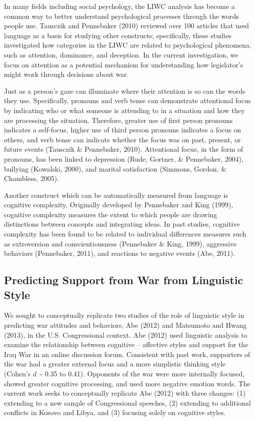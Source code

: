 \documentclass[english,,man]{apa6}
\begin{document}
In many fields including social psychology, the LIWC analysis has become a common way to better understand psychological processes through the words people use. Tausczik and Pennebaker (2010) reviewed over 100 articles that used language as a basis for studying other constructs; specifically, these studies investigated how categories in the LIWC are related to psychological phenomena, such as attention, dominance, and deception. In the current investigation, we focus on attention as a potential mechanism for understanding how legislator's might work through decisions about war.

Just as a person's gaze can illuminate where their attention is so can the words they use. Specifically, pronouns and verb tense can demonstrate attentional focus by indicating who or what someone is attending to in a situation and how they are processing the situation. Therefore, greater use of first person pronouns indicates a self-focus, higher use of third person pronouns indicates a focus on others, and verb tense can indicate whether the focus was on past, present, or future events (Tausczik \& Pennebaker, 2010). Attentional focus, in the form of pronouns, has been linked to depression (Rude, Gortner, \& Pennebaker, 2004), bullying (Kowalski, 2000), and marital satisfaction (Simmons, Gordon, \& Chambless, 2005).

Another construct which can be automatically measured from language is cognitive complexity. Originally developed by Pennebaker and King (1999), cognitive complexity measures the extent to which people are drawing distinctions between concepts and integrating ideas. In past studies, cognitive complexity has been found to be related to individual differences measures such as extroversion and conscientiousness (Pennebaker \& King, 1999), aggressive behaviors (Pennebaker, 2011), and reactions to negative events (Abe, 2011).

\hypertarget{predicting-support-from-war-from-linguistic-style}{%
\subsection{Predicting Support from War from Linguistic Style}\label{predicting-support-from-war-from-linguistic-style}}

We sought to conceptually replicate two studies of the role of linguistic style in predicting war attitudes and behaviors, Abe (2012) and Matsumoto and Hwang (2013), in the U.S. Congressional context. Abe (2012) used linguistic analysis to examine the relationship between cognitive -- affective styles and support for the Iraq War in an online discussion forum. Consistent with past work, supporters of the war had a greater external focus and a more simplistic thinking style (Cohen's \(d\) \textasciitilde{} 0.35 to 0.41). Opponents of the war were more internally focused, showed greater cognitive processing, and used more negative emotion words. The current work seeks to conceptually replicate Abe (2012) with three changes: (1) extending to a new sample of Congressional speeches, (2) extending to additional conflicts in Kosovo and Libya, and (3) focusing solely on cognitive styles.
\end{document}
